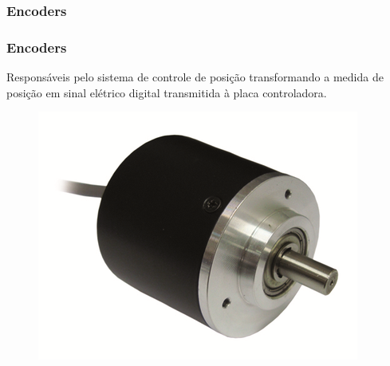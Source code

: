 \subsubsection{Encoders}

\begin{frame}
\frametitle{Encoders}

Responsáveis pelo sistema de controle de posição transformando a medida de posição em sinal elétrico digital transmitida à placa controladora.

\begin{figure}
\centering
\includegraphics[scale = 0.5]{figuras/encoder}
\end{figure}

\end{frame}
